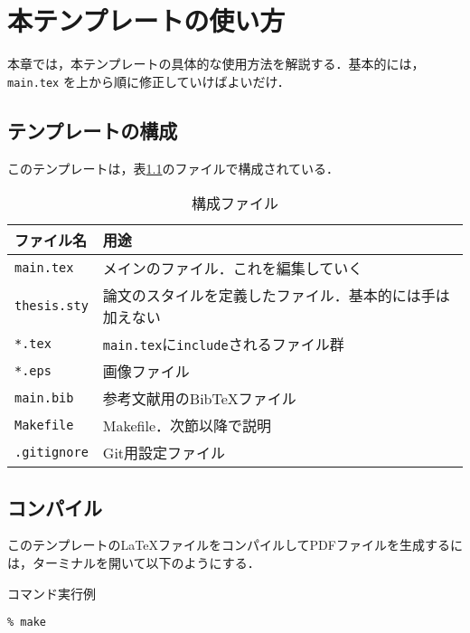 \chapter{本テンプレートの使い方}
\label{chap:howto}

本章では，本テンプレートの具体的な使用方法を解説する．基本的には，{\tt main.tex} を上から順に修正していけばよいだけ． 


\section{テンプレートの構成}

このテンプレートは，表\ref{tb:files}のファイルで構成されている．

\begin{table}[htbp]
  \caption{構成ファイル}
  \label{tb:files}
  \begin{center}
    \begin{tabular}{ll}
      \hline
      ファイル名 & 用途 \\ \hline
      \texttt{main.tex} & メインのファイル．これを編集していく \\
      \texttt{thesis.sty} & 論文のスタイルを定義したファイル．基本的には手は加えない \\
      \texttt{*.tex} & \texttt{main.tex}に\texttt{include}されるファイル群 \\
      \texttt{*.eps} & 画像ファイル \\
      \texttt{main.bib} & 参考文献用のBibTeXファイル \\
      \texttt{Makefile} & Makefile．次節以降で説明 \\
      \texttt{.gitignore} & Git用設定ファイル \\ \hline
    \end{tabular}
  \end{center}
\end{table}

\section{コンパイル}
このテンプレートの\LaTeX ファイルをコンパイルしてPDFファイルを生成するには，ターミナルを開いて以下のようにする．

\begin{itembox}[l]{コマンド実行例}
\begin{verbatim}
% make
\end{verbatim}
\end{itembox}

